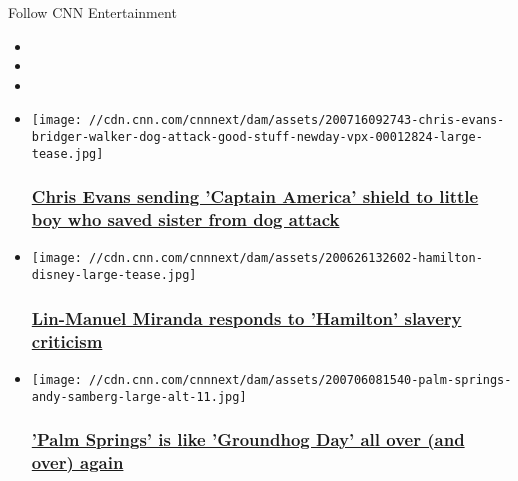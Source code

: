 Follow CNN Entertainment

\begin{itemize}
\item
\item
\item
\end{itemize}

\begin{itemize}
\item
  \href{/2020/07/16/entertainment/chris-evans-little-boy-dog-attack/index.html}{}

  \texttt{[image: //cdn.cnn.com/cnnnext/dam/assets/200716092743-chris-evans-bridger-walker-dog-attack-good-stuff-newday-vpx-00012824-large-tease.jpg]}

  \hypertarget{chris-evans-sending-captain-america-shield-to-little-boy-who-saved-sister-from-dog-attack-}{%
  \subsubsection{\texorpdfstring{\href{/2020/07/16/entertainment/chris-evans-little-boy-dog-attack/index.html}{Chris
  Evans sending 'Captain America' shield to little boy who saved sister
  from dog attack
  }}{Chris Evans sending 'Captain America' shield to little boy who saved sister from dog attack }}\label{chris-evans-sending-captain-america-shield-to-little-boy-who-saved-sister-from-dog-attack-}}
\item
  \href{/2020/07/07/entertainment/lin-manuel-miranda-hamilton-slavery/index.html}{}

  \texttt{[image: //cdn.cnn.com/cnnnext/dam/assets/200626132602-hamilton-disney-large-tease.jpg]}

  \hypertarget{lin-manuel-miranda-responds-to-hamilton-slavery-criticism}{%
  \subsubsection{\texorpdfstring{\href{/2020/07/07/entertainment/lin-manuel-miranda-hamilton-slavery/index.html}{Lin-Manuel
  Miranda responds to 'Hamilton' slavery
  criticism}}{Lin-Manuel Miranda responds to 'Hamilton' slavery criticism}}\label{lin-manuel-miranda-responds-to-hamilton-slavery-criticism}}
\end{itemize}

\begin{itemize}
\item
  \href{/2020/07/10/entertainment/palm-springs-review/index.html}{}

  \texttt{[image: //cdn.cnn.com/cnnnext/dam/assets/200706081540-palm-springs-andy-samberg-large-alt-11.jpg]}

  \hypertarget{palm-springs-is-like-groundhog-day-all-over-and-over-again}{%
  \subsubsection{\texorpdfstring{\href{/2020/07/10/entertainment/palm-springs-review/index.html}{'Palm
  Springs' is like 'Groundhog Day' all over (and over)
  again}}{'Palm Springs' is like 'Groundhog Day' all over (and over) again}}\label{palm-springs-is-like-groundhog-day-all-over-and-over-again}}
\end{itemize}

